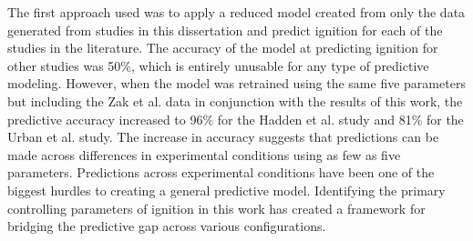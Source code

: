     The first approach used was to apply a reduced model created from only the data generated from studies in this dissertation and predict ignition for each of the studies in the literature. The accuracy of the model at predicting ignition for other studies was 50\%, which is entirely unusable for any type of predictive modeling. However, when the model was retrained using the same five parameters but including the Zak et al. data in conjunction with the results of this work, the predictive accuracy increased to 96\% for the Hadden et al. study and 81\% for the Urban et al. study. The increase in accuracy suggests that predictions can be made across differences in experimental conditions using as few as five parameters. Predictions across experimental conditions have been one of the biggest hurdles to creating a general predictive model. Identifying the primary controlling parameters of ignition in this work has created a framework for bridging the predictive gap across various configurations.  